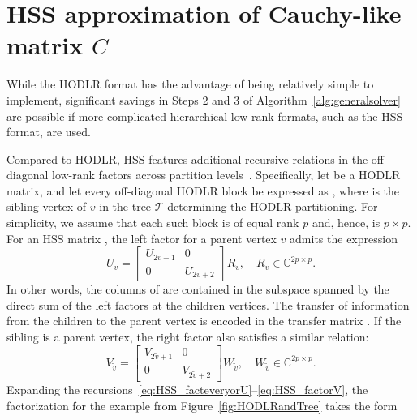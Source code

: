 \section{HSS approximation of Cauchy-like matrix $C$} 
\label{sec:HSSintro}

While the HODLR format has the advantage of being relatively simple to implement, significant savings in Steps 2 and 3 of Algorithm~\ref{alg:generalsolver} are possible if  more complicated hierarchical low-rank formats, such as the HSS format, are used. 

Compared to HODLR, HSS features additional recursive relations in the off-diagonal low-rank factors across partition levels~\cite{bebendorf2008hierarchical,hackbusch2015hierarchical, martinsson2011fast}. 
Specifically, let   be a HODLR matrix, and let every off-diagonal HODLR block 
be expressed as , where  is the sibling vertex of $v$ in the tree $\mathcal T$ determining the HODLR partitioning. For simplicity, we assume that each such block is of equal rank $p$ and, hence,  is $p \times p$. 
For an HSS matrix , the left factor  for a parent vertex $v$ admits the expression
\begin{equation} 
\label{eq:HSS_facteveryorU}
U_v = \begin{bmatrix} U_{2v+1} & 0 \\ 0 & U_{2v+2} \end{bmatrix} R_v, \quad R_v \in \mathbb{C}^{2p \times p}.
\end{equation}
In other words, the columns of  are contained in the subspace spanned by the direct sum of the left factors at the children vertices.
The transfer of information from the children to the parent vertex is encoded in the transfer matrix . If the sibling  is a parent vertex, the right factor  also satisfies a similar relation:
\begin{equation} 
\label{eq:HSS_factorV}
V_{\tilde{v}} = \begin{bmatrix} V_{2\tilde v+1} & 0 \\ 0 & V_{2\tilde v+2} \end{bmatrix} W_{\tilde{v}}, \quad W_{\tilde{v}} \in \mathbb{C}^{2p \times p}.
\end{equation}
Expanding the recursions~\eqref{eq:HSS_facteveryorU}--\eqref{eq:HSS_factorV},
the factorization  for the example from Figure~\ref{fig:HODLRandTree} takes the form

